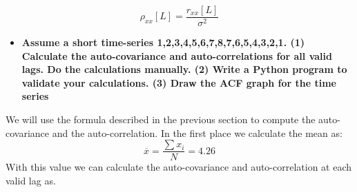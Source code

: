 \documentclass{article}
\begin{document}
\begin{equation}
        \rho_{xx}[L] = \frac{r_{xx}[L]}{\sigma^2}
    \end{equation}

    

  \begin{itemize}
     \item \textbf{Assume a short time-series {1,2,3,4,5,6,7,8,7,6,5,4,3,2,1}. (1) Calculate the auto-covariance and auto-correlations for all valid lags. Do the calculations manually. (2) Write a Python program to validate your calculations. (3) Draw the ACF graph for the time series}
 \end{itemize}

 We will use the formula described in the previous section to compute the auto-covariance and the auto-correlation. In the first place we calculate the mean as:
 \begin{equation}
     \overline{x} = \frac{\sum{x_i}}{N} = 4.26
 \end{equation}
 With this value we can calculate  the auto-covariance and auto-correlation at each valid lag as.
\end{document}
